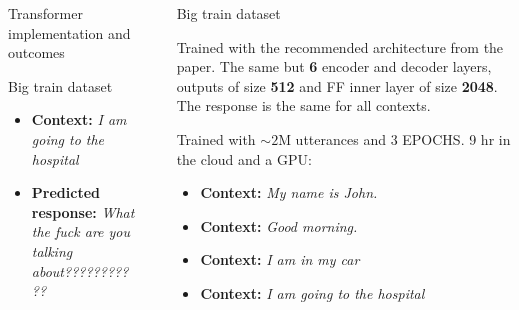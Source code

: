 \documentclass[final]{beamer}
\newlength{\sepwid}
\newlength{\onecolwid}
\newlength{\twocolwid}
\begin{document}
\begin{frame}[t]
\begin{columns}[t]
\begin{column}{\twocolwid}
\begin{columns}[t,totalwidth=\twocolwid]
\begin{column}{\onecolwid}
\begin{block}{Transformer implementation and outcomes}
\begin{alertblock}{Big train dataset}
\begin{itemize} 
	\item \textbf{Context:} \textit{I am going to the hospital}
	\item \textbf{Predicted response:} \textit{What the fuck are you talking about???????????}
\end{itemize}
\end{alertblock}

\end{block}

\end{column} %

\end{columns} %

\begin{columns}[t,totalwidth=\twocolwid] %

\end{columns} %

\end{column} %

\begin{column}{\sepwid}\end{column} %

\begin{column}{\onecolwid} %

\begin{alertblock}{Big train dataset}

Trained with the recommended architecture from the paper. The same but \textbf{6} encoder and decoder layers, outputs of size \textbf{512} and FF inner layer of size \textbf{2048}. The response is the same for all contexts.\\

\vspace{10mm}

Trained with $\sim2$M utterances and 3 EPOCHS. 9 hr in the cloud and a GPU:

\begin{itemize} 
	\item \textbf{Context:} \textit{My name is John.}
	\item \textbf{Context:} \textit{Good morning.}
	\item \textbf{Context:} \textit{I am in my car}
	\item \textbf{Context:} \textit{I am going to the hospital}
\end{itemize}


\end{alertblock}
\end{column}
\end{columns}
\end{frame}
\end{document}
